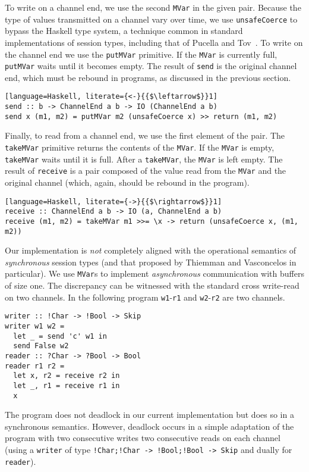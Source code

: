To write on a channel end, we use the second \lstinline|MVar| in the
given pair. Because the type of values transmitted on a channel vary
over time, we use \lstinline|unsafeCoerce| to bypass the Haskell type
system, a technique common in standard implementations of session
types, including that of Pucella and
Tov~\cite{DBLP:conf/haskell/PucellaT08}. To write on the channel end
we use the \lstinline|putMVar| primitive. If the \lstinline|MVar| is
currently full, \lstinline|putMVar| waits until it becomes empty.  The
result of \lstinline|send| is the original channel end, which must be
rebound in programs, as discussed in the previous section.
%
\begin{lstlisting}[language=Haskell, literate={<-}{{$\leftarrow$}}1]
send :: b -> ChannelEnd a b -> IO (ChannelEnd a b)
send x (m1, m2) = putMVar m2 (unsafeCoerce x) >> return (m1, m2)
\end{lstlisting}

Finally, to read from a channel end, we use the first element of the
pair. The \lstinline|takeMVar| primitive returns the contents of the
\lstinline|MVar|. If the \lstinline|MVar| is empty,
\lstinline|takeMVar| waits until it is full. After a
\lstinline|takeMVar|, the \lstinline|MVar| is left empty. The result
of \lstinline|receive| is a pair composed of the value read from the
\lstinline|MVar| and the original channel (which, again, should be
rebound in the program).
%
\begin{lstlisting}[language=Haskell, literate={->}{{$\rightarrow$}}1]
receive :: ChannelEnd a b -> IO (a, ChannelEnd a b)
receive (m1, m2) = takeMVar m1 >>= \x -> return (unsafeCoerce x, (m1, m2))
\end{lstlisting}

Our implementation is \emph{not} completely aligned with the
operational semantics of \emph{synchronous} session types (and that
proposed by Thiemman and Vasconcelos in particular). We use
\lstinline|MVar|s to implement \emph{asynchronous} communication with
buffers of size one. The discrepancy can be witnessed with the standard
cross write-read on two channels. In the following program
\lstinline|w1|-\lstinline|r1| and \lstinline|w2|-\lstinline|r2| are
two channels.
%
\begin{lstlisting}
writer :: !Char -> !Bool -> Skip
writer w1 w2 =
  let _ = send 'c' w1 in
  send False w2
reader :: ?Char -> ?Bool -> Bool
reader r1 r2 =
  let x, r2 = receive r2 in
  let _, r1 = receive r1 in
  x
\end{lstlisting}
%
The program does not deadlock in our current implementation but does
so in a synchronous semantics. However, deadlock occurs in a simple
adaptation of the program with two consecutive writes two consecutive
reads on each channel (using a \lstinline|writer| of type
\lstinline|!Char;!Char -> !Bool;!Bool -> Skip| and dually for
\lstinline|reader|).

